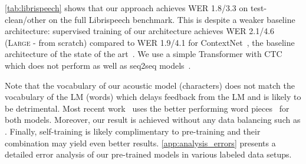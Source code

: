 \documentclass{article}
\newcommand{\wvppbig}{\textsc{Large}}
\begin{document}
\autoref{tab:librispeech} shows that our approach achieves WER 1.8/3.3 on test-clean/other on the full Librispeech benchmark.
This is despite a weaker baseline architecture: 
supervised training of our architecture achieves WER 2.1/4.6 (\wvppbig{} - from scratch) compared to WER 1.9/4.1 for ContextNet~\citep{han2020contextnet}, the baseline architecture of the state of the art~\citep{park2020improved}.
We use a simple Transformer with CTC which does not perform as well as seq2seq models~\citep{synnaeve2020end}. 

Note that the vocabulary of our acoustic model (characters) does not match the vocabulary of the LM (words) which delays feedback from the LM and is likely to be detrimental. 
Most recent work~\citep{synnaeve2020end,xu2020iterative,han2020contextnet,park2020improved} uses the better performing word pieces~\citep{schuster2012wordpieces} for both models.
Moreover, our result is achieved without any data balancing such as \cite{park2020improved}.
Finally, self-training is likely complimentary to pre-training and their combination may yield even better results.
\autoref{app:analysis_errors} presents a detailed error analysis of our pre-trained models in various labeled data setups.
\end{document}
